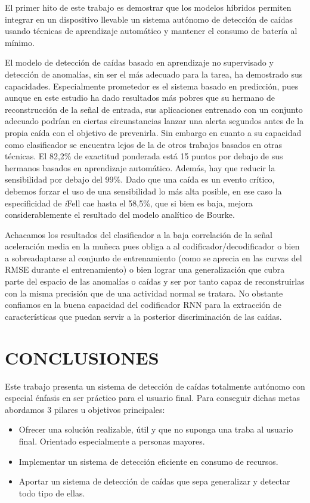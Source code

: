 \documentclass[11pt,a4paper,spanish,twocolumn]{article}
\def\ifell/{\textsl{\textsf{i}}\textsf{Fell}}
\begin{document}
El primer hito de este trabajo es demostrar que los modelos híbridos permiten integrar en un dispositivo llevable un sistema autónomo de detección de caídas usando técnicas de aprendizaje automático y mantener el consumo de batería al mínimo. 

El modelo de detección de caídas basado en aprendizaje no supervisado y detección de anomalías, sin ser el más adecuado para la tarea, ha demostrado sus capacidades. Especialmente prometedor es el sistema basado en predicción, pues aunque en este estudio ha dado resultados más pobres que su hermano de reconstrucción de la señal de entrada, sus aplicaciones entrenado con un conjunto adecuado podrían en ciertas circunstancias lanzar una alerta segundos antes de la propia caída con el objetivo de prevenirla. 
Sin embargo en cuanto a su capacidad como clasificador se encuentra lejos de la de otros trabajos basados en otras técnicas. El 82,2\% de exactitud ponderada está 15 puntos por debajo de sus hermanos basados en aprendizaje automático. Además, hay que reducir la sensibilidad por debajo del 99\%. Dado que una caída es un evento crítico, debemos forzar el uso de una sensibilidad lo más alta posible, en ese caso la especificidad de \ifell/ cae hasta el 58,5\%, que si bien es baja, mejora considerablemente el resultado del modelo analítico de Bourke. 

Achacamos los resultados del clasificador a la baja correlación de la señal aceleración media en la muñeca pues obliga a al codificador/decodificador o bien a sobreadaptarse al conjunto de entrenamiento (como se aprecia en las curvas del RMSE durante el entrenamiento) o bien lograr una generalización que cubra parte del espacio de las anomalías o caídas y ser por tanto capaz de reconstruirlas con la misma precisión que de una actividad normal se tratara. No obstante confiamos en la buena capacidad del codificador RNN para la extracción de características que puedan servir a la posterior discriminación de las caídas. 


\section{CONCLUSIONES}
Este trabajo presenta un sistema de detección de caídas totalmente autónomo con especial énfasis en ser práctico para el usuario final. Para conseguir dichas metas abordamos 3 pilares u objetivos principales:

\begin{itemize}
	\item Ofrecer una solución realizable, útil y que no suponga una traba al usuario final. Orientado especialmente a personas mayores.
	\item Implementar un sistema de detección eficiente en consumo de recursos.
	\item Aportar un sistema de detección de caídas que sepa generalizar y detectar todo tipo de ellas.
\end{itemize}
\end{document}
